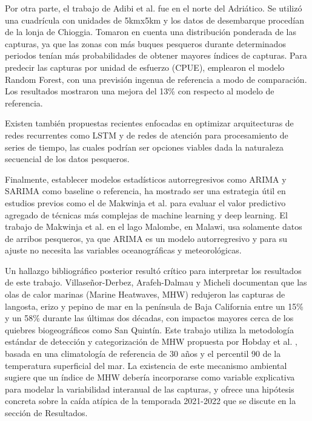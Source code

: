\documentclass[twoside,11pt]{article}
\begin{document}
Por otra parte, el trabajo de Adibi et al. fue en el norte del Adriático. Se utilizó una cuadrícula con unidades de 5kmx5km y los datos de desembarque procedían de la lonja de Chioggia. Tomaron en cuenta una distribución ponderada de las capturas, ya que las zonas con más buques pesqueros durante determinados periodos tenían más probabilidades de obtener mayores índices de capturas. Para predecir las capturas por unidad de esfuerzo (CPUE), emplearon el modelo Random Forest, con una previsión ingenua de referencia a modo de comparación. Los resultados mostraron una mejora del 13\% con respecto al modelo de referencia.


Existen también propuestas recientes enfocadas en optimizar arquitecturas de redes recurrentes como LSTM \cite{greff2017} y de redes de atención \cite{vaswani2023} para procesamiento de series de tiempo, las cuales podrían ser opciones viables dada la naturaleza secuencial de los datos pesqueros.


Finalmente, establecer modelos estadísticos autorregresivos como ARIMA y SARIMA como baseline o referencia, ha mostrado ser una estrategia útil en estudios previos como el de Makwinja et al.\cite{makwinja2021} para evaluar el valor predictivo agregado de técnicas más complejas de machine learning y deep learning. El trabajo de Makwinja et al. en el lago Malombe, en Malawi, usa solamente datos de arribos pesqueros, ya que ARIMA es un modelo autorregresivo y para su ajuste no necesita las variables oceanográficas y meteorológicas.


Un hallazgo bibliográfico posterior resultó crítico para interpretar los resultados de este trabajo. Villaseñor-Derbez, Arafeh-Dalmau y Micheli \cite{villasenor2024} documentan que las olas de calor marinas (Marine Heatwaves, MHW) redujeron las capturas de langosta, erizo y pepino de mar en la península de Baja California entre un 15\% y un 58\% durante las últimas dos décadas, con impactos mayores cerca de los quiebres biogeográficos como San Quintín. Este trabajo utiliza la metodología estándar de detección y categorización de MHW propuesta por Hobday et al. \cite{hobday2016}, basada en una climatología de referencia de 30 años y el percentil 90 de la temperatura superficial del mar. La existencia de este mecanismo ambiental sugiere que un índice de MHW debería incorporarse como variable explicativa para modelar la variabilidad interanual de las capturas, y ofrece una hipótesis concreta sobre la caída atípica de la temporada 2021-2022 que se discute en la sección de Resultados.
\end{document}
